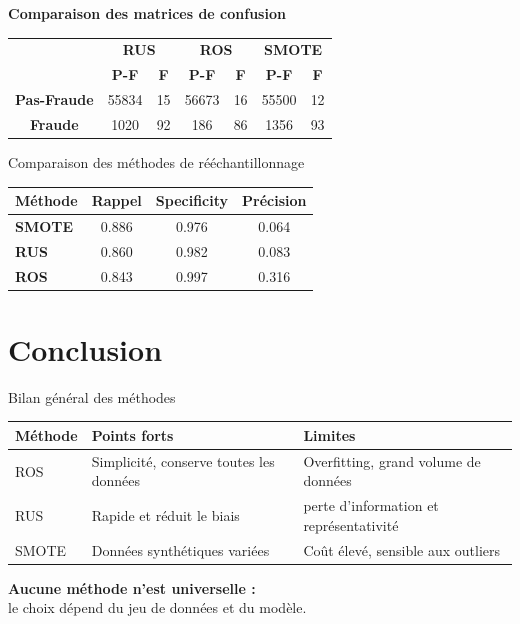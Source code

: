 \documentclass{beamer}
\begin{document}
\begin{frame}

\centering
\textbf{Comparaison des matrices de confusion}

\vspace{0.4cm}

\begin{tabular}{c|cc|cc|cc}
 & \multicolumn{2}{c|}{\textbf{RUS}} & \multicolumn{2}{c|}{\textbf{ROS}} & \multicolumn{2}{c}{\textbf{SMOTE}} \\ 
 & \textbf{P-F} & \textbf{F} & \textbf{P-F} & \textbf{F} & \textbf{P-F} & \textbf{F} \\ \hline
\textbf{Pas-Fraude} & 55834 & 15 & 56673 & 16 & 55500 & 12 \\ 
\textbf{Fraude}     & 1020  & 92 & 186   & 86 & 1356  & 93 \\ 
\end{tabular}

\vspace{0.4cm}

\begin{block}{Comparaison des méthodes de rééchantillonnage}
\centering
\begin{tabular}{lccc}
\toprule
\textbf{Méthode} & \textbf{Rappel} & \textbf{Specificity} & \textbf{Précision} \\
\midrule
\textbf{SMOTE} & 0.886 & 0.976 & 0.064 \\
\textbf{RUS} & 0.860 & 0.982 & 0.083 \\
\textbf{ROS} & 0.843 & 0.997 & 0.316 \\
\bottomrule
\end{tabular}
\end{block}



\end{frame}


\section{Conclusion}

\begin{frame}{Bilan général des méthodes}
    \centering
    \small
    \begin{tabular}{|l|p{3cm}|p{3cm}|}
        \hline
        \centering
        \textbf{Méthode} & \textbf{Points forts} & \textbf{Limites} \\
        \hline
        \centering
        ROS & Simplicité, conserve toutes les données & Overfitting, grand volume de données \\
        \hline
        \centering
        RUS & Rapide et réduit le biais & perte d'information et représentativité \\
        \hline
        \centering
        SMOTE & Données synthétiques variées & Coût élevé, sensible aux outliers \\
        \hline
    \end{tabular}
    \vspace{0.7cm}

    \textbf{Aucune méthode n’est universelle :}\\
    le choix dépend du jeu de données et du modèle.
\end{frame}
\end{document}
